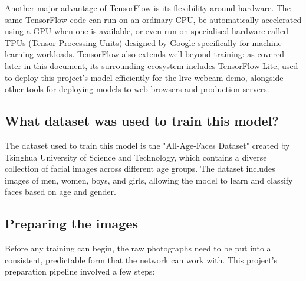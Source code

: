\documentclass[11 pt , a 4 paper ]{article}
\theoremstyle{definition}
\begin{document}
\noindent Another major advantage of TensorFlow is its flexibility around hardware. The same TensorFlow code can run on an ordinary CPU, be automatically accelerated using a GPU when one is available, or even run on specialised hardware called TPUs (Tensor Processing Units) designed by Google specifically for machine learning workloads. TensorFlow also extends well beyond training: as covered later in this document, its surrounding ecosystem includes TensorFlow Lite, used to deploy this project's model efficiently for the live webcam demo, alongside other tools for deploying models to web browsers and production servers.
 
\subsection{What dataset was used to train this model?}
The dataset used to train this model is the "All-Age-Faces Dataset" created by Tsinghua University of Science and Technology, which contains a diverse collection of facial images across different age groups. The dataset includes images of men, women, boys, and girls, allowing the model to learn and classify faces based on age and gender.
 
\subsection{Preparing the images}
 
Before any training can begin, the raw photographs need to be put into a consistent, predictable form that the network can work with. This project's preparation pipeline involved a few steps:
 
\end{document}
